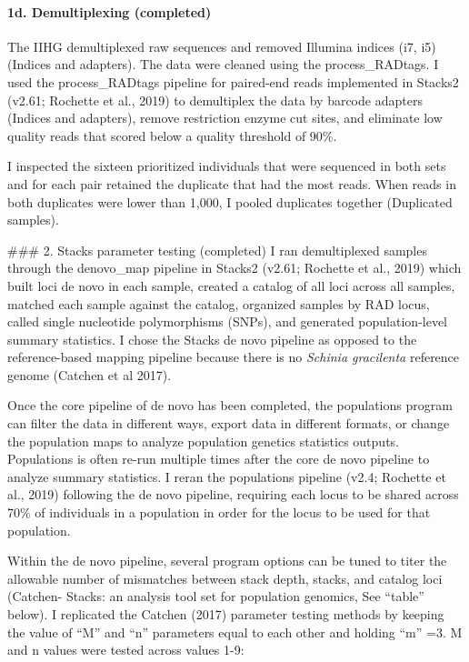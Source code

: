 \paragraph{1d. Demultiplexing
(completed)}\label{d.-demultiplexing-completed}

The IIHG demultiplexed raw sequences and removed Illumina indices (i7,
i5) (Indices and adapters). The data were cleaned using the
process\_RADtags. I used the process\_RADtags pipeline for paired-end
reads implemented in Stacks2 (v2.61; Rochette et al., 2019) to
demultiplex the data by barcode adapters (Indices and adapters), remove
restriction enzyme cut sites, and eliminate low quality reads that
scored below a quality threshold of 90\%.

I inspected the sixteen prioritized individuals that were sequenced in
both sets and for each pair retained the duplicate that had the most
reads. When reads in both duplicates were lower than 1,000, I pooled
duplicates together (Duplicated samples).

\#\#\# 2. Stacks parameter testing (completed) I ran demultiplexed
samples through the denovo\_map pipeline in Stacks2 (v2.61; Rochette et
al., 2019) which built loci de novo in each sample, created a catalog of
all loci across all samples, matched each sample against the catalog,
organized samples by RAD locus, called single nucleotide polymorphisms
(SNPs), and generated population-level summary statistics. I chose the
Stacks de novo pipeline as opposed to the reference-based mapping
pipeline because there is no \emph{Schinia gracilenta} reference genome
(Catchen et al 2017).

Once the core pipeline of de novo has been completed, the populations
program can filter the data in different ways, export data in different
formats, or change the population maps to analyze population genetics
statistics outputs. Populations is often re-run multiple times after the
core de novo pipeline to analyze summary statistics. I reran the
populations pipeline (v2.4; Rochette et al., 2019) following the de novo
pipeline, requiring each locus to be shared across 70\% of individuals
in a population in order for the locus to be used for that population.

Within the de novo pipeline, several program options can be tuned to
titer the allowable number of mismatches between stack depth, stacks,
and catalog loci (Catchen- Stacks: an analysis tool set for population
genomics, See ``table'' below). I replicated the Catchen (2017)
parameter testing methods by keeping the value of ``M'' and ``n''
parameters equal to each other and holding ``m'' =3. M and n values were
tested across values 1-9:


